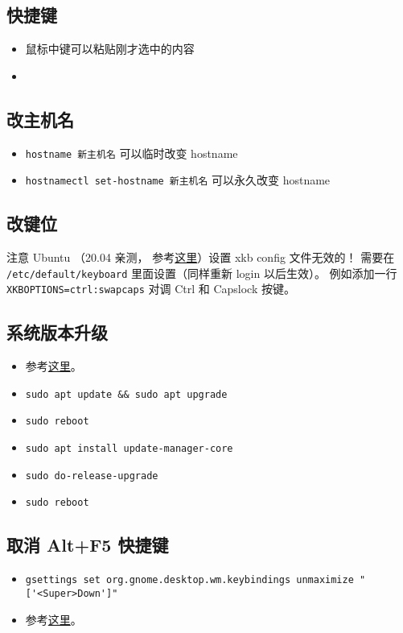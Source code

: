 
\subsection{快捷键}
\begin{itemize}
\item 鼠标中键可以粘贴刚才选中的内容
\item \
\end{itemize}


\subsection{改主机名}
\begin{itemize}
\item \verb|hostname 新主机名| 可以临时改变 hostname
\item \verb|hostnamectl set-hostname 新主机名| 可以永久改变 hostname
\end{itemize}


\subsection{改键位}\label{sub_Ubuntu_1}
注意 Ubuntu （20.04 亲测， 参考\href{https://manpages.ubuntu.com/manpages/focal/en/man5/keyboard.5.html}{这里}）设置 xkb config 文件无效的！ 需要在 \verb|/etc/default/keyboard| 里面设置（同样重新 login 以后生效）。 例如添加一行 \verb|XKBOPTIONS=ctrl:swapcaps| 对调 Ctrl 和 Capslock 按键。

\subsection{系统版本升级}
\begin{itemize}
\item 参考\href{https://www.cyberciti.biz/faq/upgrade-ubuntu-18-04-to-20-04-lts-using-command-line/#Make_a_backup}{这里}。
\item \verb|sudo apt update && sudo apt upgrade|
\item \verb|sudo reboot|
\item \verb|sudo apt install update-manager-core|
\item \verb|sudo do-release-upgrade|
\item \verb|sudo reboot|
\end{itemize}

\subsection{取消 Alt+F5 快捷键}
\begin{itemize}
\item \verb|gsettings set org.gnome.desktop.wm.keybindings unmaximize "['<Super>Down']"|
\item 参考\href{https://askubuntu.com/questions/1322105/cant-find-alt-f5-in-settings-keyboard-shortcuts}{这里}。
\end{itemize}

